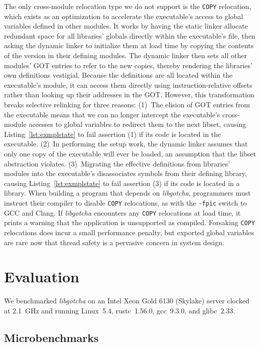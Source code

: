 The only cross-module relocation type we do not support is the \texttt{COPY}
relocation, which exists as an optimization to accelerate the executable's access to
global variables defined in other modules.  It works by having the static linker
allocate redundant space for all libraries' globals directly within the executable's
file, then asking the dynamic linker to initialize them at load time by copying the
contents of the version in their defining modules.  The dynamic linker then sets all
other modules' GOT entries to refer to the new copies, thereby rendering the
libraries' own definitions vestigial.  Because the definitions are all located within
the executable's module, it can access them directly using instruction-relative
offsets rather than looking up their addresses in the GOT.  However, this
transformation breaks selective relinking for three reasons:  (1)~The elision of
GOT entries from the executable means that we can no longer intercept the
executable's cross-module accesses to global variables to redirect them to the next
libset, causing Listing~\ref{lst:exmplstate} to fail assertion (1) if its code is
located in the executable.  (2)~In performing the setup work, the dynamic linker
assumes that only one copy of the executable will ever be loaded, an assumption that
the libset abstraction violates.  (3)~Migrating the effective definitions from
libraries' modules into the executable's disassociates symbols from their defining
library, causing Listing~\ref{lst:exmplstate} to fail assertion (3) if its code is
located in a library.  When building a program that depends on \textit{libgotcha},
programmers must instruct their compiler to disable \texttt{COPY} relocations, as
with the \texttt{-fpic} switch to GCC and Clang.  If \textit{libgotcha} encounters
any \texttt{COPY} relocations at load time, it prints a warning that the application
is unsupported as compiled.  Forsaking \texttt{COPY} relocations does incur a small
performance penalty, but exported global variables are rare now that thread safety
is a pervasive concern in system design.


\section{Evaluation}
\label{sec:gotcha:eval}

We benchmarked \textit{libgotcha} on an Intel Xeon Gold 6130 (Skylake) server clocked
at 2.1~GHz and running Linux~5.4, rustc~1.56.0, gcc~9.3.0, and glibc~2.33.


\subsection{Microbenchmarks}

